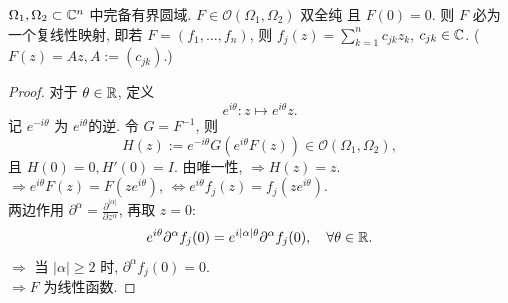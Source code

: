 \begin{corollary}[Cartan]
 $ \Omega _1, \Omega _2 \subset {\mathbb C}^n $ 中完备有界圆域. $ F \in \mathcal{O}(\Omega _1,\Omega _2) $ 双全纯 且 $ F(0)=0 $. 则 $ F $ 必为一个复线性映射, 即若 $ F=(f_1,\dots,f_n) $, 则 $ f_j(z)=\sum_{k=1}^{n} c_{jk}z_k $, $ c_{jk} \in {\mathbb C} $.
 ($ F(z)=Az, A:=(c_{jk}) $.)
\end{corollary}
\begin{proof}
  对于 $\theta \in {\mathbb R}$, 定义 
  $$ e^{i \theta }: z \mapsto e^{i \theta }z. $$ 
  记 $e^{-i \theta }$ 为 $e^{i \theta }$的逆. 令 $G=F^{-1}$, 则
  $$ H(z):= e^{-i \theta } G(e^{i \theta }F(z)) \in \mathcal{O}(\Omega _1, \Omega _2),$$   
  且 $H(0)=0,H'(0)=I$. 
  由唯一性, $\Rightarrow H(z)=z$.\\
  $\Rightarrow  e^{i \theta }F(z)=F(z e ^{i \theta })$, $\Leftrightarrow e^{i \theta }f_j(z)=f_j(z e^{i \theta })$.\\
  两边作用 $\partial ^\alpha =\frac{\partial^{|\alpha |} }{\partial z^{\alpha }}$,    再取 $z=0$: 
  $$ e^{i \theta } \partial ^{\alpha } f_j(0)=e^{i |\alpha | \theta } \partial ^{\alpha } f_j(0), \quad \forall \theta \in {\mathbb R}.$$       
  $\Rightarrow $ 当 $|\alpha| \geq 2$  时, $\partial ^{\alpha }f_j(0)=0$.\\
  $\Rightarrow F$ 为线性函数.     
\end{proof}

